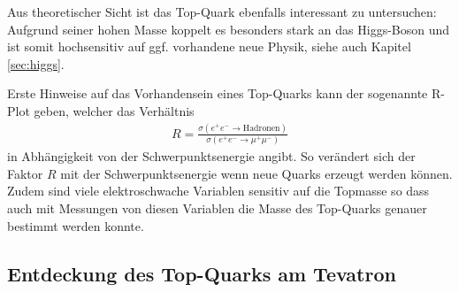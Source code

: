 Aus theoretischer Sicht ist das Top-Quark ebenfalls interessant zu untersuchen:
Aufgrund seiner hohen Masse koppelt es besonders stark an das Higgs-Boson und ist somit hochsensitiv auf ggf. vorhandene neue Physik, siehe auch Kapitel \ref{sec:higgs}.

Erste Hinweise auf das Vorhandensein eines Top-Quarks kann der sogenannte R-Plot geben, welcher das Verhältnis
\begin{align*}
	R = \frac{\sigma\left( e^+ e^- \rightarrow \text{Hadronen} \right)}{\sigma \left( e^+ e^- \rightarrow \mu^+ \mu^- \right)}
\end{align*}
in Abhängigkeit von der Schwerpunktsenergie angibt.
So verändert sich der Faktor $R$ mit der Schwerpunktsenergie wenn neue Quarks erzeugt werden können.
Zudem sind viele elektroschwache Variablen sensitiv auf die Topmasse so dass auch mit Messungen von diesen Variablen die Masse des Top-Quarks genauer bestimmt werden konnte.

\subsection{Entdeckung des Top-Quarks am Tevatron}

